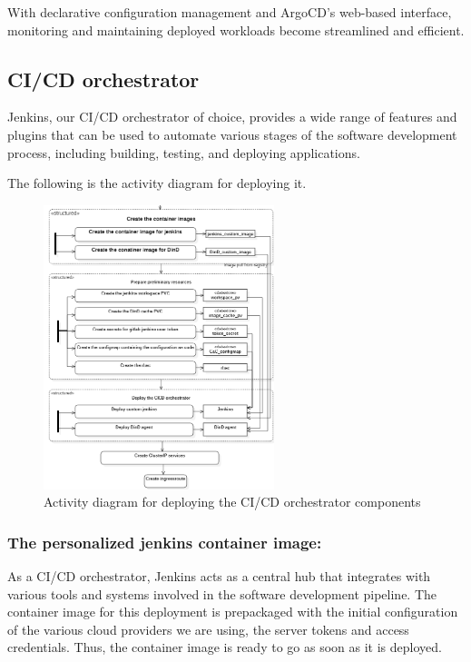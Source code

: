 \hspace{7mm}With declarative configuration management and ArgoCD's web-based interface, monitoring and maintaining deployed workloads become streamlined and efficient.

\newpage

\subsection{CI/CD orchestrator }

\hspace{7mm}Jenkins, our CI/CD orchestrator of choice, provides a wide range of features and plugins that can be used to automate various stages of the software development process, including building, testing, and deploying applications.

\hspace{7mm}The following is the activity diagram for deploying it. 

\begin{figure}[H]\centering
\includegraphics[width=0.6\textwidth,angle=00]{assets/f44.png}
\caption{Activity diagram for deploying the CI/CD orchestrator components}
\label{fig:Activity diagram for deploying the CI/CD orchestrator components}
\end{figure}
 
\subsubsection{The personalized jenkins container image: }

\hspace{7mm}As a CI/CD orchestrator, Jenkins acts as a central hub that integrates with various tools and systems involved in the software development pipeline. The container image for this deployment is prepackaged with the initial configuration of the various cloud providers we are using, the server tokens and access credentials. Thus, the container image is ready to go as soon as it is deployed.

